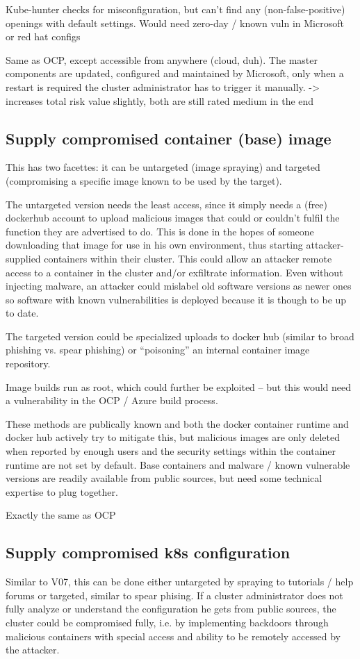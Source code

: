 Kube-hunter checks for misconfiguration, but can’t find any (non-false-positive) openings with default settings. Would need zero-day / known vuln in Microsoft or red hat configs

Same as OCP, except accessible from anywhere (cloud, duh).
The master components are updated, configured and maintained by Microsoft, only when a restart is required the cluster administrator has to trigger it manually.
-> increases total risk value slightly, both are still rated medium in the end

\subsection{Supply compromised container (base) image}
This has two facettes: it can be untargeted (image spraying) and targeted (compromising a specific image known to be used by the target).

The untargeted version needs the least access, since it simply needs a (free) dockerhub account to upload malicious images that could or couldn’t fulfil the function they are advertised to do. This is done in the hopes of someone downloading that image for use in his own environment, thus starting attacker-supplied containers within their cluster.
This could allow an attacker remote access to a container in the cluster and/or exfiltrate information.
Even without injecting malware, an attacker could mislabel old software versions as newer ones so software with known vulnerabilities is deployed because it is though to be up to date.

The targeted version could be specialized uploads to docker hub (similar to broad phishing vs. spear phishing) or “poisoning” an internal container image repository.

Image builds run as root, which could further be exploited – but this would need a vulnerability in the OCP / Azure build process.

These methods are publically known and both the docker container runtime and docker hub actively try to mitigate this, but malicious images are only deleted when reported by enough users and the security settings within the container runtime are not set by default.
Base containers and malware / known vulnerable versions are readily available from public sources, but need some technical expertise to plug together.

Exactly the same as OCP

\subsection{Supply compromised k8s configuration}
Similar to V07, this can be done either untargeted by spraying to tutorials / help forums or targeted, similar to spear phising.
If a cluster administrator does not fully analyze or understand the configuration he gets from public sources, the cluster could be compromised fully, i.e. by implementing backdoors through malicious containers with special access and ability to be remotely accessed by the attacker.

